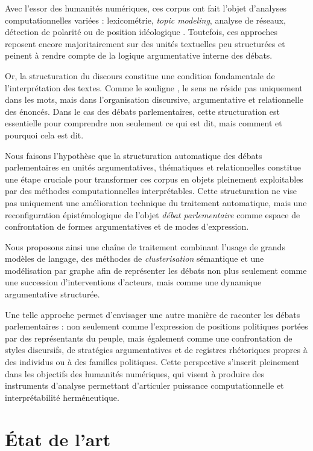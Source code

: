 \documentclass[final, fra]{anthology-ch}      %
\begin{document}
Avec l’essor des humanités numériques, ces corpus ont fait l’objet d’analyses computationnelles variées : lexicométrie, \textit{topic modeling}, analyse de réseaux, détection de polarité ou de position idéologique \cite{grimmer2013, conover2011}. Toutefois, ces approches reposent encore majoritairement sur des unités textuelles peu structurées et peinent à rendre compte de la logique argumentative interne des débats.

Or, la structuration du discours constitue une condition fondamentale de l’interprétation des textes. Comme le souligne \cite{rastier2015arts}, le sens ne réside pas uniquement dans les mots, mais dans l’organisation discursive, argumentative et relationnelle des énoncés. Dans le cas des débats parlementaires, cette structuration est essentielle pour comprendre non seulement ce qui est dit, mais comment et pourquoi cela est dit.

Nous faisons l’hypothèse que la structuration automatique des débats parlementaires en unités argumentatives, thématiques et relationnelles constitue une étape cruciale pour transformer ces corpus en objets pleinement exploitables par des méthodes computationnelles interprétables. Cette structuration ne vise pas uniquement une amélioration technique du traitement automatique, mais une reconfiguration épistémologique de l’objet \textit{débat parlementaire} comme espace de confrontation de formes argumentatives et de modes d’expression.

Nous proposons ainsi une chaîne de traitement combinant l’usage de grands modèles de langage, des méthodes de \textit{clusterisation} sémantique et une modélisation par graphe afin de représenter les débats non plus seulement comme une succession d’interventions d’acteurs, mais comme une dynamique argumentative structurée.

Une telle approche permet d’envisager une autre manière de raconter les débats parlementaires : non seulement comme l’expression de positions politiques portées par des représentants du peuple, mais également comme une confrontation de styles discursifs, de stratégies argumentatives et de registres rhétoriques propres à des individus ou à des familles politiques. Cette perspective s’inscrit pleinement dans les objectifs des humanités numériques, qui visent à produire des instruments d’analyse permettant d’articuler puissance computationnelle et interprétabilité herméneutique.


\section{État de l’art}
\end{document}
